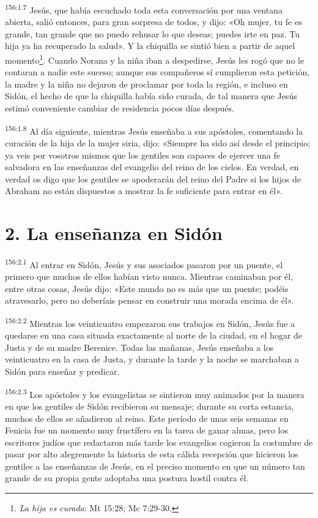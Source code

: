 \par 
\textsuperscript{156:1.7} Jesús, que había escuchado toda esta conversación por una ventana abierta, salió entonces, para gran sorpresa de todos, y dijo: «Oh mujer, tu fe es grande, tan grande que no puedo rehusar lo que deseas; puedes irte en paz. Tu hija ya ha recuperado la salud». Y la chiquilla se sintió bien a partir de aquel momento\footnote{\textit{La hija es curada}: Mt 15:28; Mc 7:29-30.}. Cuando Norana y la niña iban a despedirse, Jesús les rogó que no le contaran a nadie este suceso; aunque sus compañeros sí cumplieron esta petición, la madre y la niña no dejaron de proclamar por toda la región, e incluso en Sidón, el hecho de que la chiquilla había sido curada, de tal manera que Jesús estimó conveniente cambiar de residencia pocos días después.

\par 
\textsuperscript{156:1.8} Al día siguiente, mientras Jesús enseñaba a sus apóstoles, comentando la curación de la hija de la mujer siria, dijo: «Siempre ha sido así desde el principio; ya veis por vosotros mismos que los gentiles son capaces de ejercer una fe salvadora en las enseñanzas del evangelio del reino de los cielos. En verdad, en verdad os digo que los gentiles se apoderarán del reino del Padre si los hijos de Abraham no están dispuestos a mostrar la fe suficiente para entrar en él».

\section*{2. La enseñanza en Sidón}
\par 
\textsuperscript{156:2.1} Al entrar en Sidón, Jesús y sus asociados pasaron por un puente, el primero que muchos de ellos habían visto nunca. Mientras caminaban por él, entre otras cosas, Jesús dijo: «Este mundo no es más que un puente; podéis atravesarlo, pero no deberíais pensar en construir una morada encima de él».

\par 
\textsuperscript{156:2.2} Mientras los veinticuatro empezaron sus trabajos en Sidón, Jesús fue a quedarse en una casa situada exactamente al norte de la ciudad, en el hogar de Justa y de su madre Berenice. Todas las mañanas, Jesús enseñaba a los veinticuatro en la casa de Justa, y durante la tarde y la noche se marchaban a Sidón para enseñar y predicar.

\par 
\textsuperscript{156:2.3} Los apóstoles y los evangelistas se sintieron muy animados por la manera en que los gentiles de Sidón recibieron su mensaje; durante su corta estancia, muchos de ellos se añadieron al reino. Este período de unas seis semanas en Fenicia fue un momento muy fructífero en la tarea de ganar almas, pero los escritores judíos que redactaron más tarde los evangelios cogieron la costumbre de pasar por alto alegremente la historia de esta cálida recepción que hicieron los gentiles a las enseñanzas de Jesús, en el preciso momento en que un número tan grande de su propia gente adoptaba una postura hostil contra él.

